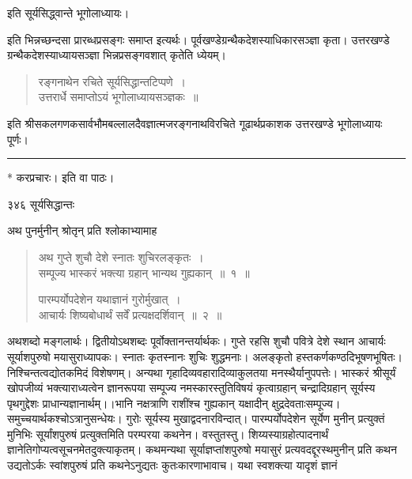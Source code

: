 \documentclass[11pt, openany]{book}
\begin{document}
\begin{center}
 इति सूर्यसिद्ध्वान्ते भूगोलाध्यायः। 
\end{center}

 इति भिन्नच्छन्दसा प्रारब्धप्रसङ्गः समाप्त इत्यर्थः। पूर्वखण्डेग्रन्थैकदेशस्याधिकारसञ्ज्ञा कृता। उत्तरखण्डे ग्रन्थैकदेशस्याध्यायसञ्ज्ञा भिन्नप्रसङ्गवशात् कृतेति ध्येयम्। 


\begin{quote}
{\qt रङ्गनाथेन रचिते सूर्यसिद्धान्तटिप्पणे~।\\
उत्तरार्धे समाप्तोऽयं भूगोलाध्यायसञ्ज्ञकः~॥ }
\end{quote}
 इति श्रीसकलगणकसार्वभौमबल्लालदैवज्ञात्मजरङ्गनाथविरचिते गूढार्थप्रकाशक उत्तरखण्डे भूगोलाध्यायः पूर्णः। 



\noindent\rule{\linewidth}{.5pt}

\begin{center}
  * करप्रचारः। इति वा पाठः।
\end{center}
\newpage

\noindent ३४६ \hspace{4cm} सूर्यसिद्धान्तः
\vspace{1cm}


\begin{center}
 अथ पुनर्मुनीन् श्रोतृन् प्रति श्लोकाभ्यामाह \textendash
\end{center}


\begin{quote}
{\ssi अथ गुप्ते शुचौ देशे स्नातः शुचिरलङ्कृतः~।\\
 सम्पूज्य भास्करं भक्त्या ग्रहान् भान्यथ गुह्यकान्~॥~१~॥

पारम्पर्योपदेशेन यथाज्ञानं गुरोर्मुखात्~।\\
आचार्यः शिष्यबोधार्थं सर्वें प्रत्यक्षदर्शिवान्~॥~२~॥}
\end{quote}
 अथशब्दो मङ्गलार्थः। द्वितीयोऽथशब्दः पूर्वोक्तानन्तर्यार्थकः। गुप्ते रहसि शुचौ पवित्रे देशे स्थान आचार्यः सूर्याशपुरुषो मयासुराध्यापकः। स्नातः कृतस्नानः शुचिः शुद्धमनाः। अलङ्कृतो हस्तकर्णकण्ठदिभूषणभूषितः। निश्चिन्तत्वद्योतकमिदं विशेषणम्। अन्यथा गृहादिव्यवहारादिव्याकुलतया मनस्थैर्यानुपपत्तेः। भास्करं श्रीसूर्यं खोपजीव्यं भक्त्याराध्यत्वेन ज्ञानरूपया सम्पूज्य नमस्कारस्तुतिविषयं कृत्वाग्रहान् चन्द्रादिग्रहान् सूर्यस्य पृथगुद्देशः प्राधान्यज्ञानार्थम्।।भानि नक्षत्राणि राशींश्च गुह्यकान् यक्षादीन् क्षुद्रदेवताःसम्पूज्य। समुच्चयार्थकश्चोऽत्रानुसन्धेयः। गुरोः सूर्यस्य मुखाद्वदनारविन्दात्। पारम्पर्योपदेशेन सूर्येण मुनीन् प्रत्युक्तं मुनिभिः सूर्यांशपुरुषं प्रत्युक्तमिति परम्परया कथनेन। वस्तुतस्तु। शिय्यस्याग्रहोत्पादनार्थं ज्ञानेतिगोप्यत्वसूचनमेतदुक्त्याकृतम्। कथमन्यथा सूर्याज्ञप्तांशपुरुषो मयासुरं प्रत्यवदद्दूरस्थमुनीन् प्रति कथन उद्यतोऽर्कः स्वांशपुरुषं प्रति कथनेऽनुद्यतः कुतःकारणाभावाच। यथा स्वशक्त्या यादृशं ज्ञानं \textendash
\end{document}
